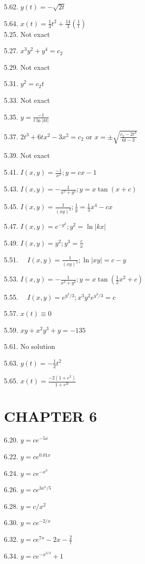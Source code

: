 \documentclass[10pt]{article}
\begin{document}
5.62. $y(t)=-\sqrt{2 t}$

5.64. $x(t)=\frac{1}{3} t^{2}+\frac{14}{3}\left(\frac{1}{t}\right)$\\
5.25. Not exact

5.27. $x^{3} y^{2}+y^{4}=c_{2}$

5.29. Not exact

5.31. $y^{2}=c_{2} t$

5.33. Not exact

5.35. $y=\frac{-1}{t \ln |k t|}$

5.37. $2 t^{3}+6 t x^{2}-3 x^{2}=c_{2}$ or $x= \pm \sqrt{\frac{c_{2}-2 t^{3}}{6 t-3}}$

5.39. Not exact

5.41. $I(x, y)=\frac{-1}{x^{2}} ; y=c x-1$

5.43. $I(x, y)=-\frac{1}{x^{2}+y^{2}} ; y=x \tan (x+c)$

5.45. $I(x, y)=\frac{1}{(x y)^{2}} ; \frac{1}{y}=\frac{1}{3} x^{4}-c x$

5.47. $I(x, y)=e^{-y^{2}} ; y^{2}=\ln |k x|$

5.49. $I(x, y)=y^{2} ; y^{3}=\frac{c}{x}$

5.51. $\quad I(x, y)=\frac{1}{(x y)^{2}} ; \ln |x y|=c-y$

5.53. $I(x, y)=-\frac{1}{x^{2}+y^{2}} ; y=x \tan \left(\frac{1}{2} x^{2}+c\right)$

5.55. $\quad I(x, y)=e^{y^{3} / 3} ; x^{3} y^{2} e^{y^{3} / 3}=c$

5.57. $x(t) \equiv 0$

5.59. $x y+x^{2} y^{3}+y=-135$

5.61. No solution

5.63. $y(t)=-\frac{1}{2} t^{2}$

5.65. $x(t)=\frac{-2\left(1+e^{2}\right)}{1+e^{2 t}}$

\section*{CHAPTER 6}
6.20. $y=c e^{-5 x}$

6.22. $y=c e^{0.01 x}$

6.24. $y=c e^{-x^{3}}$

6.26. $y=c e^{3 x^{5} / 5}$

6.28. $y=c / x^{2}$

6.30. $y=c e^{-2 / x}$

6.32. $y=c e^{7 x}-2 x-\frac{2}{7}$

6.34. $y=c e^{-x^{3 / 3}}+1$
\end{document}
